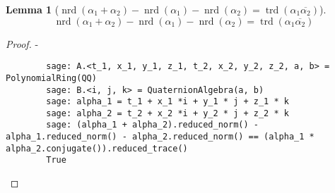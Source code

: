 \documentclass[10pt]{article}
\theoremstyle{plain}
\newtheorem{lemma}[theorem]{Lemma}
\theoremstyle{definition}
\newcommand{\op}{\operatorname}
\newcommand{\nrd}{\op{nrd}}
\newcommand{\trd}{\op{trd}}
\begin{document}
\begin{lemma}[\( \nrd(\alpha_1 + \alpha_2) - \nrd(\alpha_1) - \nrd(\alpha_2) = \trd(\alpha_1 \overline{\alpha_2}) \)]
    \[
        \nrd(\alpha_1 + \alpha_2) - \nrd(\alpha_1) - \nrd(\alpha_2) = \trd(\alpha_1 \overline{\alpha_2})
    \]
\end{lemma}
\begin{proof}
    -
    \begin{lstlisting}
        sage: A.<t_1, x_1, y_1, z_1, t_2, x_2, y_2, z_2, a, b> = PolynomialRing(QQ)
        sage: B.<i, j, k> = QuaternionAlgebra(a, b)
        sage: alpha_1 = t_1 + x_1 *i + y_1 * j + z_1 * k
        sage: alpha_2 = t_2 + x_2 *i + y_2 * j + z_2 * k
        sage: (alpha_1 + alpha_2).reduced_norm() - alpha_1.reduced_norm() - alpha_2.reduced_norm() == (alpha_1 * alpha_2.conjugate()).reduced_trace()
        True
    \end{lstlisting}
\end{proof}
\end{document}
